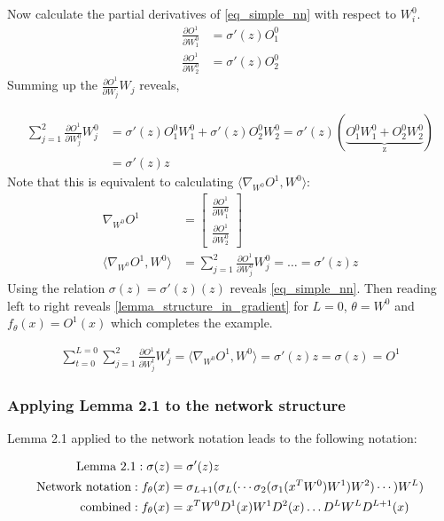 \documentclass[a4paper]{article}
\begin{document}
Now calculate the partial derivatives of \eqref{eq_simple_nn} with respect to $W^0_i$.
\begin{align*}
	\frac{\partial O^1}{\partial W^0_1} &= \sigma'(z) O^0_1 \\
	\frac{\partial O^1}{\partial W^0_2} &= \sigma'(z) O^0_2
\end{align*}
Summing up the $\frac{\partial O^1}{\partial W_j} W_j$ reveals,

\begin{align*}
	\sum_{j=1}^{2} \frac{\partial O^1}{\partial W^0_j} W^0_j &= \sigma'(z) O^0_1  W^0_1 + \sigma'(z) O^0_2  W^0_2 = \sigma'(z)(\underbrace{O^0_1 W^0_1 + O^0_2 W^0_2}_\text{z}) \\
														&= \sigma'(z) z
\end{align*}
Note that this is equivalent to calculating $\langle \nabla_{W^0} O^1, W^0 \rangle$:
\begin{align*}
	\nabla_{W^0} O^1 &= 
		\begin{bmatrix}
			\frac{\partial O^1}{\partial W^0_1} \\ 
			\frac{\partial O^1}{\partial W^0_2}
		\end{bmatrix} \\
	\langle \nabla_{W^0} O^1, W^0 \rangle &= \sum_{j=1}^{2} \frac{\partial O^1}{\partial W^0_j} W^0_j = \dots = \sigma'(z) z
\end{align*}
Using the relation $\sigma(z) = \sigma'(z)(z)$ reveals \eqref{eq_simple_nn}. Then reading left to right reveals \eqref{lemma_structure_in_gradient} for $L=0$, $\theta= W^0$ and $f_\theta(x) = O^1(x)$ which completes the example.

\begin{align*}
		\sum_{t=0}^{L=0} \sum_{j=1}^{2} \frac{\partial O^1}{\partial W^t_j} W^t_j
		=  \langle \nabla_{W^0} O^1, W^0 \rangle
		= \sigma'(z) z 
		= \sigma(z) = O^1
\end{align*}


\subsubsection{Applying Lemma 2.1 to the network structure}

Lemma 2.1 applied to the network notation leads to the following notation:

\begin{align}
	\label{eq:lemma2_1}
	\text{Lemma 2.1} : \sigma(z) &= \sigma'(z) z \\
	\label{eq:basicNN}
	\text{Network notation} : f_\theta(x) &= { \sigma_{L+1}( \sigma_{L}( \cdots \sigma_{2}( \sigma_1( x^T W^0) W^1) W^2) \cdots) W^L) } \\
	\label{eq:structuredNN}
	\text{combined} : f_\theta(x) &= { x^T W^0 D^1(x) W^1 D^2(x) \dots D^L W^L D^{L+1}(x) }
\end{align}
\end{document}
